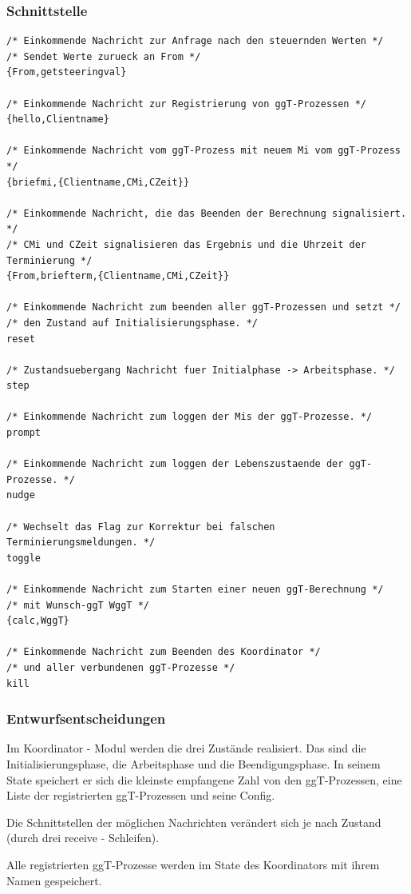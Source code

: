 \documentclass{article}
\begin{document}
\subsubsection{Schnittstelle}
\begin{lstlisting}
/* Einkommende Nachricht zur Anfrage nach den steuernden Werten */
/* Sendet Werte zurueck an From */
{From,getsteeringval}

/* Einkommende Nachricht zur Registrierung von ggT-Prozessen */
{hello,Clientname}

/* Einkommende Nachricht vom ggT-Prozess mit neuem Mi vom ggT-Prozess */
{briefmi,{Clientname,CMi,CZeit}}

/* Einkommende Nachricht, die das Beenden der Berechnung signalisiert. */
/* CMi und CZeit signalisieren das Ergebnis und die Uhrzeit der Terminierung */
{From,briefterm,{Clientname,CMi,CZeit}}

/* Einkommende Nachricht zum beenden aller ggT-Prozessen und setzt */
/* den Zustand auf Initialisierungsphase. */
reset

/* Zustandsuebergang Nachricht fuer Initialphase -> Arbeitsphase. */
step

/* Einkommende Nachricht zum loggen der Mis der ggT-Prozesse. */
prompt

/* Einkommende Nachricht zum loggen der Lebenszustaende der ggT-Prozesse. */
nudge

/* Wechselt das Flag zur Korrektur bei falschen Terminierungsmeldungen. */
toggle

/* Einkommende Nachricht zum Starten einer neuen ggT-Berechnung */
/* mit Wunsch-ggT WggT */
{calc,WggT}

/* Einkommende Nachricht zum Beenden des Koordinator */
/* und aller verbundenen ggT-Prozesse */
kill
\end{lstlisting}

\subsubsection{Entwurfsentscheidungen}
Im Koordinator - Modul werden die drei Zustände realisiert. Das sind die Initialisierungsphase, die Arbeitsphase und
die Beendigungsphase. In seinem State speichert er sich die kleinste empfangene Zahl von den ggT-Prozessen, eine Liste
der registrierten ggT-Prozessen und seine Config.

Die Schnittstellen der möglichen Nachrichten verändert sich je nach Zustand (durch drei receive - Schleifen).

Alle registrierten ggT-Prozesse werden im State des Koordinators mit ihrem Namen gespeichert.\\
\end{document}
